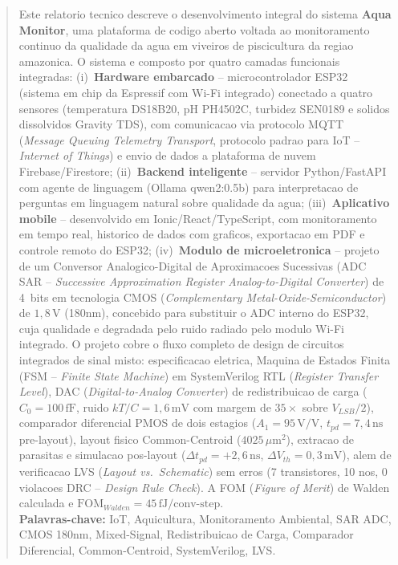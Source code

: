 \documentclass[12pt, a4paper]{article}
\begin{document}
\begin{abstract}
\noindent
Este relatorio tecnico descreve o desenvolvimento integral do sistema \textbf{Aqua Monitor},
uma plataforma de codigo aberto voltada ao monitoramento continuo da qualidade da agua em
viveiros de piscicultura da regiao amazonica. O sistema e composto por quatro camadas funcionais
integradas: (i)~\textbf{Hardware embarcado} -- microcontrolador ESP32 (sistema em chip da
Espressif com Wi-Fi integrado) conectado a quatro sensores (temperatura DS18B20, pH PH4502C,
turbidez SEN0189 e solidos dissolvidos Gravity TDS), com comunicacao via protocolo MQTT
(\textit{Message Queuing Telemetry Transport}, protocolo padrao para IoT -- \textit{Internet of Things})
e envio de dados a plataforma de nuvem Firebase/Firestore; (ii)~\textbf{Backend inteligente}
-- servidor Python/FastAPI com agente de linguagem (Ollama qwen2:0.5b) para interpretacao de
perguntas em linguagem natural sobre qualidade da agua; (iii)~\textbf{Aplicativo mobile}
-- desenvolvido em Ionic/React/TypeScript, com monitoramento em tempo real, historico de dados
com graficos, exportacao em PDF e controle remoto do ESP32; (iv)~\textbf{Modulo de microeletronica}
-- projeto de um Conversor Analogico-Digital de Aproximacoes Sucessivas (ADC SAR --
\textit{Successive Approximation Register Analog-to-Digital Converter}) de 4~bits em
tecnologia CMOS (\textit{Complementary Metal-Oxide-Semiconductor}) de $1{,}8\,\text{V}$ (180nm),
concebido para substituir o ADC interno do ESP32, cuja qualidade e degradada pelo ruido
radiado pelo modulo Wi-Fi integrado. O projeto cobre o fluxo completo de design de circuitos
integrados de sinal misto: especificacao eletrica, Maquina de Estados Finita (FSM --
\textit{Finite State Machine}) em SystemVerilog RTL (\textit{Register Transfer Level}),
DAC (\textit{Digital-to-Analog Converter}) de redistribuicao de carga ($C_0 = 100\,\text{fF}$,
ruido $kT/C = 1{,}6\,\text{mV}$ com margem de $35\times$ sobre $V_{LSB}/2$), comparador
diferencial PMOS de dois estagios ($A_1 = 95\,\text{V/V}$, $t_{pd} = 7{,}4\,\text{ns}$
pre-layout), layout fisico Common-Centroid ($4025\,\mu\text{m}^2$), extracao de parasitas
e simulacao pos-layout ($\Delta t_{pd} = +2{,}6\,\text{ns}$, $\Delta V_{th} = 0{,}3\,\text{mV}$),
alem de verificacao LVS (\textit{Layout vs.~Schematic}) sem erros (7 transistores, 10 nos,
0 violacoes DRC -- \textit{Design Rule Check}). A FOM (\textit{Figure of Merit}) de Walden
calculada e $\text{FOM}_{Walden} = 45\,\text{fJ/conv-step}$.\\[0.5em]
\textbf{Palavras-chave:} IoT, Aquicultura, Monitoramento Ambiental, SAR ADC, CMOS 180nm,
Mixed-Signal, Redistribuicao de Carga, Comparador Diferencial, Common-Centroid, SystemVerilog, LVS.
\end{abstract}
\newpage
\end{document}
